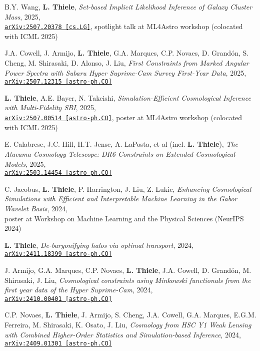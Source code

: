 B.Y. Wang, {\bf L. Thiele}, \emph{Set-based Implicit Likelihood Inference of Galaxy Cluster Mass}, 2025,\\
\href{https://arxiv.org/abs/2507.20378}{\mbox{\texttt{arXiv:2507.20378 [cs.LG]}}},
spotlight talk at ML4Astro workshop (colocated with ICML 2025)

J.A. Cowell, J. Armijo, {\bf L. Thiele}, G.A. Marques, C.P. Novaes, D. Grand\'on, S. Cheng,
M. Shirasaki, D. Alonso, J. Liu,
\emph{First Constraints from Marked Angular Power Spectra with Subaru Hyper Suprime-Cam Survey First-Year Data}, 2025,\\
\href{https://arxiv.org/abs/2507.12315}{\mbox{\texttt{arXiv:2507.12315 [astro-ph.CO]}}}

{\bf L. Thiele}, A.E. Bayer, N. Takeishi,
\emph{Simulation-Efficient Cosmological Inference with Multi-Fidelity SBI}, 2025,\\
\href{https://arxiv.org/abs/2507.00514}{\mbox{\texttt{arXiv:2507.00514 [astro-ph.CO]}}},
poster at ML4Astro workshop (colocated with ICML 2025)

E. Calabrese, J.C. Hill, H.T. Jense, A. LaPosta, et al (incl. {\bf L. Thiele}),
\emph{The Atacama Cosmology Telescope: DR6 Constraints on Extended Cosmological Models}, 2025,\\
\href{http://arxiv.org/abs/2503.14454}{\mbox{\texttt{arXiv:2503.14454 [astro-ph.CO]}}}

C. Jacobus, {\bf L. Thiele}, P. Harrington, J. Liu, Z. Lukic,
\emph{Enhancing Cosmological Simulations with Efficient and Interpretable Machine Learning
in the Gabor Wavelet Basis}, 2024,\\
poster at Workshop on Machine Learning and the Physical Sciences (NeurIPS 2024)

{\bf L. Thiele}, \emph{De-baryonifying halos via optimal transport}, 2024,\\
\href{http://arxiv.org/abs/2411.18399}{\mbox{\texttt{arXiv:2411.18399 [astro-ph.CO]}}}

J. Armijo, G.A. Marques, C.P. Novaes, {\bf L. Thiele}, J.A. Cowell, D. Grand\'on,
M. Shirasaki, J. Liu,
\emph{Cosmological constraints using Minkowski functionals from the first year
data of the Hyper Suprime-Cam}, 2024,\\
\href{https://arxiv.org/abs/2410.00401}{\mbox{\texttt{arXiv:2410.00401 [astro-ph.CO]}}}

C.P. Novaes, {\bf L. Thiele}, J. Armijo, S. Cheng, J.A. Cowell, G.A. Marques, E.G.M. Ferreira,
M. Shirasaki, K. Osato, J. Liu,
\emph{Cosmology from HSC Y1 Weak Lensing with Combined Higher-Order Statistics and
Simulation-based Inference}, 2024,\\
\href{https://arxiv.org/abs/2409.01301}{\mbox{\texttt{arXiv:2409.01301 [astro-ph.CO]}}}


